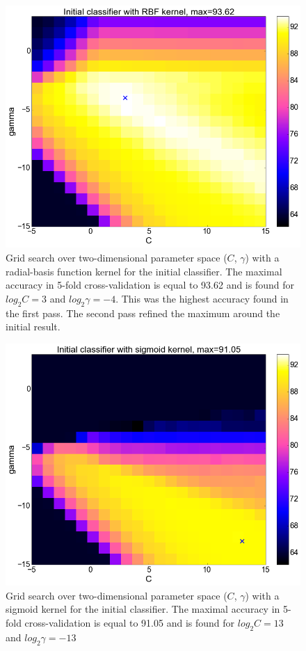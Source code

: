\begin{center}
\begin{figure}
	\centering
  \includegraphics[width=1\textwidth]{plots/init_rbf}
   \caption{Grid search over two-dimensional parameter space ($C$, $\gamma$) with a radial-basis function kernel for the initial classifier. The maximal accuracy in 5-fold cross-validation is equal to 93.62 and is found for $log_{2}C=3$ and $log_{2}\gamma=-4$. This was the highest accuracy found in the first pass. The second pass refined the maximum around the initial result.}
   \label{fig:initial_rbf}
\end{figure}
\begin{figure}
	\centering
  \includegraphics[width=1\textwidth]{plots/init_sigmoid}
  \caption{Grid search over two-dimensional parameter space ($C$, $\gamma$) with a sigmoid kernel for the initial classifier. The maximal accuracy in 5-fold cross-validation is equal to 91.05 and is found for $log_{2}C=13$ and $log_{2}\gamma=-13$}


\end{figure}
\end{center}
